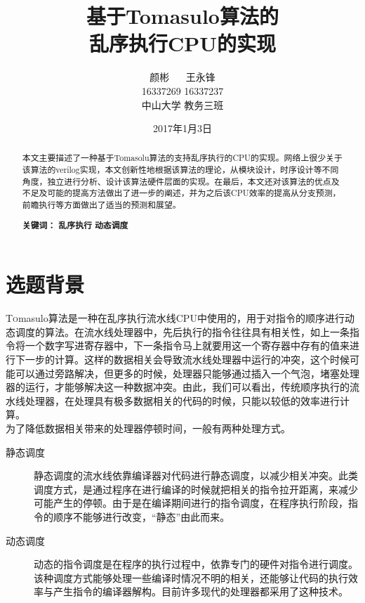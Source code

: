 \documentclass[twoside]{article}
\title{\vspace{-15mm}\fontsize{24pt}{10pt}\selectfont\textbf{基于Tomasulo算法的\\乱序执行CPU的实现}} %
\author{
\large
\textsc{颜彬 \(\quad\) 王永锋}\\[2mm] %
\textsc{16337269 16337237} \\ [2mm]
\normalsize 中山大学 教务三班  \\ %
\vspace{-5mm}
}
\date{2017年1月3日}
\begin{document}
\maketitle %

\thispagestyle{fancy} %

\begin{abstract}
	本文主要描述了一种基于Tomasolu算法的支持乱序执行的CPU的实现。网络上很少关于该算法的verilog实现，本文创新性地根据该算法的理论，从模块设计，时序设计等不同角度，独立进行分析、设计该算法硬件层面的实现。在最后，本文还对该算法的优点及不足及可能的提高方法做出了进一步的阐述，并为之后该CPU效率的提高从分支预测，前瞻执行等方面做出了适当的预测和展望。

	\textbf{关键词： }\textbf{乱序执行} \textbf{动态调度}
\end{abstract}


\section{选题背景}
\lettrine[nindent=0em,lines=3]{T}omasulo算法是一种在乱序执行流水线CPU中使用的，用于对指令的顺序进行动态调度的算法。在流水线处理器中，先后执行的指令往往具有相关性，如上一条指令将一个数字写进寄存器中，下一条指令马上就要用这一个寄存器中存有的值来进行下一步的计算。这样的数据相关会导致流水线处理器中运行的冲突，这个时候可能可以通过旁路解决，但更多的时候，处理器只能够通过插入一个气泡，堵塞处理器的运行，才能够解决这一种数据冲突。由此，我们可以看出，传统顺序执行的流水线处理器，在处理具有极多数据相关的代码的时候，只能以较低的效率进行计算。\\

为了降低数据相关带来的处理器停顿时间，一般有两种处理方式。\cite{book:zcs}
\begin{description}
	\item[静态调度] 静态调度的流水线依靠编译器对代码进行静态调度，以减少相关冲突。此类调度方式，是通过程序在进行编译的时候就把相关的指令拉开距离，来减少可能产生的停顿。由于是在编译期间进行的指令调度，在程序执行阶段，指令的顺序不能够进行改变，“静态”由此而来。
	\item[动态调度]	动态的指令调度是在程序的执行过程中，依靠专门的硬件对指令进行调度。该种调度方式能够处理一些编译时情况不明的相关，还能够让代码的执行效率与产生指令的编译器解构。目前许多现代的处理器都采用了这种技术。
\end{description}
\end{document}
